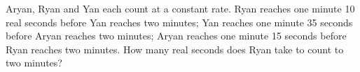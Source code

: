 Aryan, Ryan and Yan each count at a constant rate. Ryan reaches one minute 10 real seconds before Yan reaches two minutes; Yan reaches one minute 35 seconds before Aryan reaches two minutes; Aryan reaches one minute 15 seconds before Ryan reaches two minutes. How many real seconds does Ryan take to count to two minutes?
